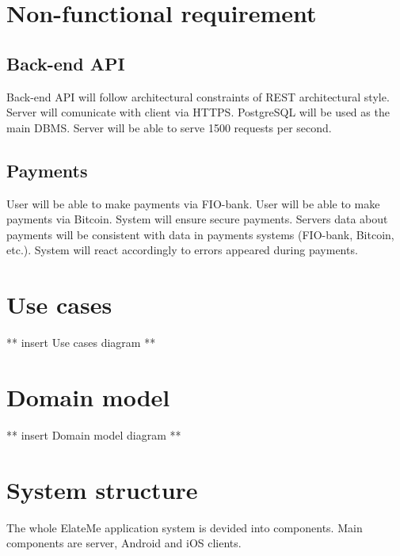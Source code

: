 \section{Non-functional requirement}

\subsection{Back-end \ac{API}}
Back-end API will follow architectural constraints of REST architectural style.
Server will comunicate with client via \ac{HTTPS}.
PostgreSQL will be used as the main DBMS.
Server will be able to serve 1500 requests per second.

\subsection{Payments}
User will be able to make payments via FIO-bank.
User will be able to make payments via Bitcoin.
System will ensure secure payments.
Servers data about payments will be consistent with data in payments systems (FIO-bank, Bitcoin, etc.).
System will react accordingly to errors appeared during payments.


\section{Use cases}
** insert Use cases diagram **



\section{Domain model}
** insert Domain model diagram **



\section{System structure}
The whole ElateMe application system is devided into components. Main components are server, Android and iOS clients.

